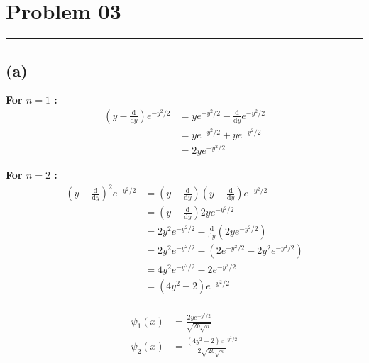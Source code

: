 \documentclass[letter, 10pts]{article}
\begin{document}
\newpage
\section*{Problem 03} 
\hrule
\subsection*{(a)} 
\textbf{For $n=1$ :}
\begin{align*}
	\left(y - \frac{\mathrm{d} }{\mathrm{d} y}\right) e^{-y^2 / 2}
	&= y e^{-y^2 / 2} - \frac{\mathrm{d} }{\mathrm{d} y} e^{-y ^2 / 2}  \\
	&= 
	ye^{- y^2 / 2}  + 
	ye^{- y^2 / 2} 
	\\
	&= 
	2 ye^{- y^2 / 2} 
\end{align*}




\textbf{For $n=2$ :}
\begin{align*}
	\left(y - \frac{\mathrm{d} }{\mathrm{d} y}\right)^2 e^{- y^2 / 2}
	&=  
	\left(y - \frac{\mathrm{d} }{\mathrm{d} y}\right)
	\left(y - \frac{\mathrm{d} }{\mathrm{d} y}\right) e^{- y^2 / 2} \\ 
	&=
	\left(y - \frac{\mathrm{d} }{\mathrm{d} y}\right) 
	2 y e^{ - y^2 / 2} \\ 
	&= 
2y^2 e^{- y^2 / 2} - 
\frac{\mathrm{d} }{\mathrm{d} y} 
\left(
2 y e^{- y^2 / 2}
\right)
	\\
	&= 
2 y^2 e^{- y^2 / 2} 
- 
\left(
2 e ^{ - y ^2 / 2} 
- 
2 y^2 e^{- y^2 / 2}
\right)
	\\ 
	&= 
4 y^2 e^{- y ^2 / 2} - 2 e^{ - y ^2 / 2} 
	\\
	&= (4 y^2 - 2)e^{- y^2 / 2} \\
\end{align*}


\begin{align*}
	\psi_1(x) 
	&= 
	\frac{2 y e ^{ - y ^2 / 2}}{\sqrt{2 b\sqrt{\pi} }  } \tag{$y = x / b$}
	\\
	\psi_2(x) 
	&= 
\frac{(4 y^2 - 2) e^{ - y ^2 / 2}}{2 \sqrt{2b\sqrt{\pi} } }
	\\
\end{align*}
\end{document}
